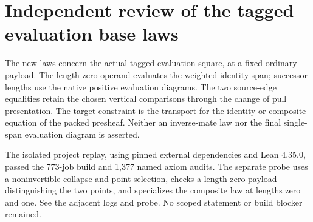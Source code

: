 \documentclass{article}
\begin{document}
\section*{Independent review of the tagged evaluation base laws}
The new laws concern the actual tagged evaluation square, at a fixed ordinary payload. The length-zero operand evaluates the weighted identity span; successor lengths use the native positive evaluation diagrams. The two source-edge equalities retain the chosen vertical comparisons through the change of pull presentation. The target constraint is the transport for the identity or composite equation of the packed presheaf. Neither an inverse-mate law nor the final single-span evaluation diagram is asserted.
\par The isolated project replay, using pinned external dependencies and Lean 4.35.0, passed the 773-job build and 1,377 named axiom audits. The separate probe uses a noninvertible collapse and point selection, checks a length-zero payload distinguishing the two points, and specializes the composite law at lengths zero and one. See the adjacent logs and probe. No scoped statement or build blocker remained.
\end{document}

